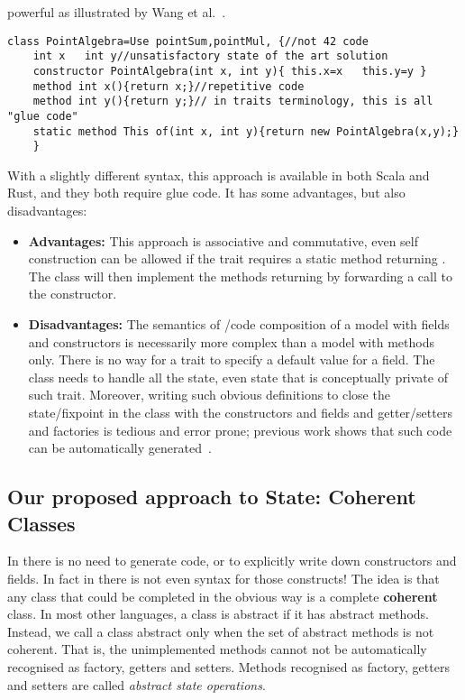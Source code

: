 powerful as illustrated by Wang et al.~\cite{wang2016classless}.
\begin{lstlisting}
class PointAlgebra=Use pointSum,pointMul, {//not 42 code
    int x   int y//unsatisfactory state of the art solution
    constructor PointAlgebra(int x, int y){ this.x=x   this.y=y }
    method int x(){return x;}//repetitive code
    method int y(){return y;}// in traits terminology, this is all "glue code"
    static method This of(int x, int y){return new PointAlgebra(x,y);}
    }
\end{lstlisting}

\noindent 

With a slightly different syntax, this approach is available in both Scala and Rust, and they both require glue code.
It has some advantages, but also disadvantages: 

\begin{itemize}

\item {\bf Advantages:} This approach is associative and commutative, even self construction
  can be allowed if the trait requires a static method
  returning \Q@This@. The class will then implement the methods returning \Q@This@
  by forwarding a call to the constructor.
  
\item {\bf Disadvantages:}
   The semantics of \Q@Use@/code composition of a model with fields and constructors is necessarily
   more complex than a model with methods only.
 There is no way for a trait to specify a default value for a field.
The class needs to handle all the state, even state that is conceptually
   private of such trait. 
 Moreover, writing such obvious definitions to close
  the state/fixpoint in the class 
   with the constructors and fields and getter/setters and factories is tedious and error prone; previous work shows that such code can be automatically
   generated~\cite{wang2016classless}.
\end{itemize}

\subsection{Our proposed approach to State: Coherent Classes}

In \name there is no need to generate
code, or to explicitly write down constructors and fields. In fact in
\name there is not even syntax for those constructs!  The idea is that
any class that could be completed in the obvious way  is a
  complete \textbf{coherent} class.  In most other languages, a class is
abstract if it has abstract methods.  Instead, we call a class
abstract only when the set of abstract methods is not coherent. That
is, the unimplemented methods cannot not be automatically recognised
as factory, getters and setters. Methods recognised as factory, getters and setters are called
\emph{abstract state operations}.
  
